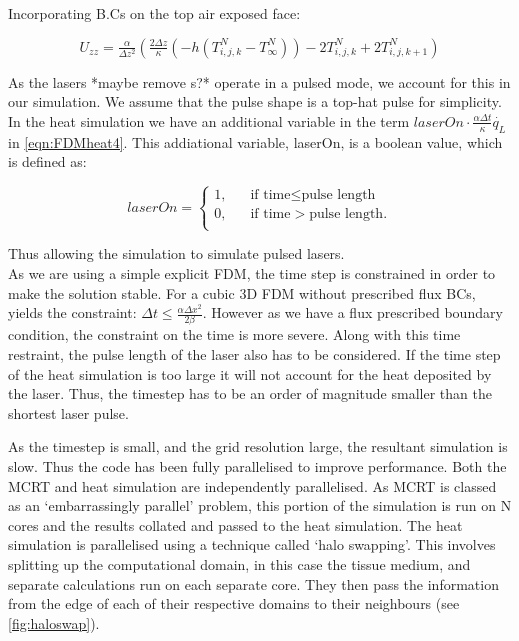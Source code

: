Incorporating B.Cs on the top air exposed face:

\begin{equation}
U_{zz} = \tfrac{\alpha}{\Delta z^2} (\tfrac{2 \Delta z}{\kappa} (-h(T^N_{i,j,k}-T^N_\infty) ) -2 T^N_{i,j,k} + 2T^N_{i,j,k+1}) 
\end{equation}

As the lasers *maybe remove s?* operate in a pulsed mode, we account for this in our simulation. We assume that the pulse shape is a top-hat pulse for simplicity. In the heat simulation we have an additional variable in the term $laserOn\cdot\tfrac{\alpha \Delta t}{\kappa}\dot{q_L}$ in \cref{eqn:FDMheat4}. This addiational variable, laserOn, is a boolean value, which is defined as:

\[   
laserOn = 
     \begin{cases}
       \text{1,} &\quad\text{if time}\le\text{pulse length}\\
       \text{0,} &\quad\text{if time}>\text{pulse length}.\\
     \end{cases}
\]

Thus allowing the simulation to simulate pulsed lasers.\\

As we are using a simple explicit FDM, the time step is constrained in order to make the solution stable. For a cubic 3D FDM without prescribed flux BCs, yields the constraint: $\Delta t \leq \tfrac{\alpha \Delta x^2}{2\beta}$. However as we have a flux prescribed boundary condition, the constraint on the time is more severe. Along with this time restraint, the pulse length of the laser also has to be considered. If the time step of the heat simulation is too large it will not account for the heat deposited by the laser. Thus, the timestep has to be an order of magnitude smaller than the shortest laser pulse.

As the timestep is small, and the grid resolution large, the resultant simulation is slow. Thus the code has been fully parallelised to improve performance. Both the MCRT and heat simulation are independently parallelised. As MCRT is classed as an `embarrassingly parallel' problem, this portion of the simulation is run on N cores and the results collated and passed to the heat simulation.
The heat simulation is parallelised using a technique called `halo swapping'. This involves splitting up the computational domain, in this case the tissue medium, and separate calculations run on each separate core. They then pass the information from the edge of each of their respective domains to their neighbours (see \cref{fig:haloswap}).


